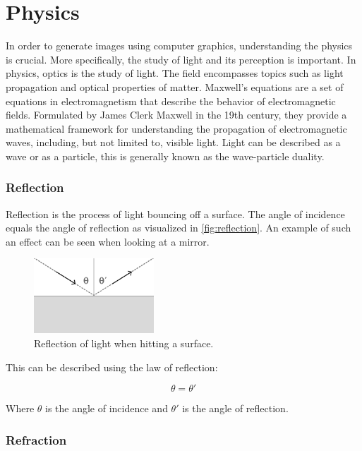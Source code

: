 \section{Physics}

In order to generate images using computer graphics, understanding the physics is crucial. More specifically, the study of light and its perception is important. In physics, optics is the study of light. The field encompasses topics such as light propagation and optical properties of matter. Maxwell's equations are a set of equations in electromagnetism that describe the behavior of electromagnetic fields. Formulated by James Clerk Maxwell in the 19th century, they provide a mathematical framework for understanding the propagation of electromagnetic waves, including, but not limited to, visible light. Light can be described as a wave or as a particle, this is generally known as the wave-particle duality. \cite{fowles1989introduction}

\subsubsection{Reflection}

Reflection is the process of light bouncing off a surface. The angle of incidence equals the angle of reflection as visualized in \autoref{fig:reflection}. An example of such an effect can be seen when looking at a mirror.

\begin{figure}[H]
  \centering
  \includegraphics[width=0.4\textwidth]{resources/reflection.png}
  \caption{Reflection of light when hitting a surface.}
  \label{fig:reflection}
\end{figure}

This can be described using the law of reflection:

\begin{equation}
  \label{eqn:law-of-reflection}
  \theta = \theta'
\end{equation}

Where $\theta$ is the angle of incidence and $\theta'$ is the angle of reflection.

\subsubsection{Refraction}

